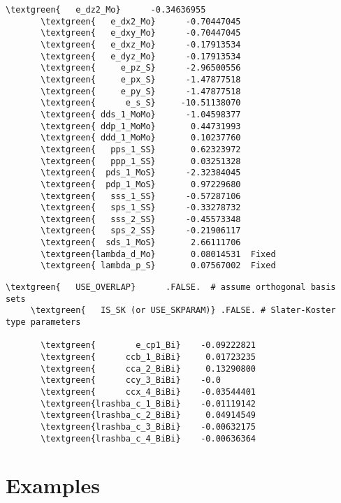 \documentclass[a4paper,12pt]{scrartcl}
\newcommand{\textgreen}[1]{\textcolor{green!50!black}{\texttt{#1}}}
\begin{document}
\begin{description}
\begin{Verbatim}[commandchars=\\\{\},gobble=4, frame=single, framesep=2mm, 
    label= example of PFILE: PARAM\_FIT.dat for MoS$_2$ (IS\_SK  .TRUE.),
    labelposition=bottomline]
       \textgreen{   e_dz2_Mo}      -0.34636955
       \textgreen{   e_dx2_Mo}      -0.70447045
       \textgreen{   e_dxy_Mo}      -0.70447045
       \textgreen{   e_dxz_Mo}      -0.17913534
       \textgreen{   e_dyz_Mo}      -0.17913534
       \textgreen{     e_pz_S}      -2.96500556
       \textgreen{     e_px_S}      -1.47877518
       \textgreen{     e_py_S}      -1.47877518
       \textgreen{      e_s_S}     -10.51138070
       \textgreen{ dds_1_MoMo}      -1.04598377
       \textgreen{ ddp_1_MoMo}       0.44731993
       \textgreen{ ddd_1_MoMo}       0.10237760
       \textgreen{   pps_1_SS}       0.62323972
       \textgreen{   ppp_1_SS}       0.03251328
       \textgreen{  pds_1_MoS}      -2.32384045
       \textgreen{  pdp_1_MoS}       0.97229680
       \textgreen{   sss_1_SS}      -0.57287106
       \textgreen{   sps_1_SS}      -0.33278732
       \textgreen{   sss_2_SS}      -0.45573348
       \textgreen{   sps_2_SS}      -0.21906117
       \textgreen{  sds_1_MoS}       2.66111706
       \textgreen{lambda_d_Mo}       0.08014531  Fixed
       \textgreen{ lambda_p_S}       0.07567002  Fixed

\end{Verbatim}

\begin{Verbatim}[commandchars=\\\{\},gobble=4, frame=single, framesep=2mm, 
    label= example of PFILE: PARAM\_FIT.dat for Bi/Si(110) (IS\_SK  .FALSE.),
    labelposition=bottomline]
     \textgreen{   USE_OVERLAP}      .FALSE.  # assume orthogonal basis sets   
     \textgreen{   IS_SK (or USE_SKPARAM)} .FALSE. # Slater-Koster type parameters  

       \textgreen{        e_cp1_Bi}    -0.09222821  
       \textgreen{      ccb_1_BiBi}     0.01723235  
       \textgreen{      cca_2_BiBi}     0.13290800  
       \textgreen{      ccy_3_BiBi}    -0.0         
       \textgreen{      ccx_4_BiBi}    -0.03544401  
       \textgreen{lrashba_c_1_BiBi}    -0.01119142  
       \textgreen{lrashba_c_2_BiBi}     0.04914549  
       \textgreen{lrashba_c_3_BiBi}    -0.00632175  
       \textgreen{lrashba_c_4_BiBi}    -0.00636364  

\end{Verbatim}
	

\end{description}

\newpage
\part{Examples}
\setcounter{section}{0}
\end{document}
